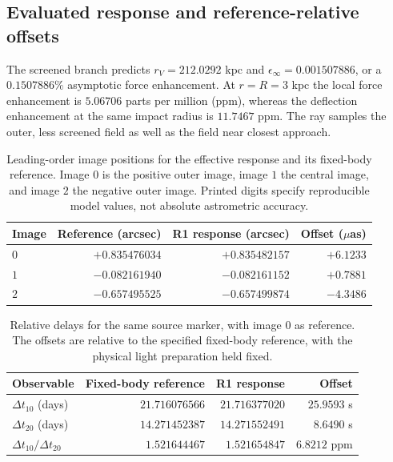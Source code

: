 \subsection{Evaluated response and reference-relative offsets}
The screened branch predicts
$r_V=212.0292$ kpc and
$\epsilon_\infty=0.001507886$, or a $0.1507886\%$ asymptotic
force enhancement. At $r=R=3$ kpc the local force enhancement is
$5.06706$ parts per million (ppm), whereas the deflection enhancement at
the same impact radius is $11.7467$ ppm. The ray samples the outer,
less screened field as well as the field near closest approach.

\begin{table}[htbp]
 \centering
 \caption{Leading-order image positions for the effective response and its
 fixed-body reference. Image $0$ is the positive
 outer image, image $1$ the central image, and image $2$ the negative
 outer image. Printed digits specify reproducible model values, not
 absolute astrometric accuracy.}
 \label{tab:images}
 \begin{tabular}{lrrr}
 \toprule
 Image & Reference (arcsec) & R1 response (arcsec) & Offset ($\mu$as)\\
 \midrule
 $0$ & $+0.835476034$ & $+0.835482157$ & $+6.1233$\\
 $1$ & $-0.082161940$ & $-0.082161152$ & $+0.7881$\\
 $2$ & $-0.657495525$ & $-0.657499874$ & $-4.3486$\\
 \bottomrule
 \end{tabular}
\end{table}

\begin{table}[htbp]
 \centering
 \caption{Relative delays for the same source marker, with image $0$ as
 reference. The offsets are relative to the specified
 fixed-body reference, with the physical light preparation held fixed.}
 \label{tab:delays}
 \begin{tabular}{lrrr}
 \toprule
 Observable & Fixed-body reference & R1 response & Offset\\
 \midrule
 $\Delta t_{10}$ (days) & $21.716076566$ & $21.716377020$ & $25.9593$ s\\
 $\Delta t_{20}$ (days) & $14.271452387$ & $14.271552491$ & $8.6490$ s\\
 $\Delta t_{10}/\Delta t_{20}$ & $1.521644467$ & $1.521654847$ & $6.8212$ ppm\\
 \bottomrule
 \end{tabular}
\end{table}

